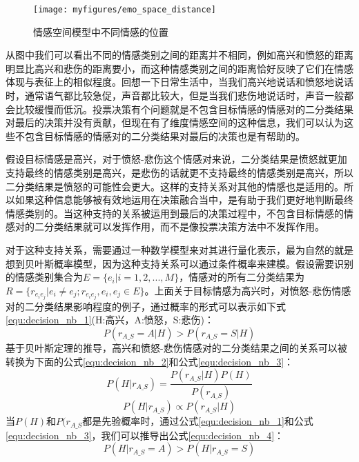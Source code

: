 \begin{figure}[htb] %
    \vspace{-0.8cm}  %
    \setlength{\belowcaptionskip}{0cm}   %
    \centering
    \texttt{[image: myfigures/emo\_space\_distance]}
    \caption{情感空间模型中不同情感的位置}
    \label{fig:emo_space_distance}
\end{figure}

从图中我们可以看出不同的情感类别之间的距离并不相同，例如高兴和愤怒的距离明显比高兴和悲伤的距离要小，而这种情感类别之间的距离恰好反映了它们在情感体现与表征上的相似程度。回想一下日常生活中，当我们高兴地说话和愤怒地说话时，通常语气都比较急促，声音都比较大，但是当我们悲伤地说话时，声音一般都会比较缓慢而低沉。投票决策有个问题就是不包含目标情感的情感对的二分类结果对最后的决策并没有贡献，但现在有了维度情感空间的这种信息，我们可以认为这些不包含目标情感的情感对的二分类结果对最后的决策也是有帮助的。

假设目标情感是高兴，对于愤怒-悲伤这个情感对来说，二分类结果是愤怒就更加支持最终的情感类别是高兴，是悲伤的话就更不支持最终的情感类别是高兴，所以二分类结果是愤怒的可能性会更大。这样的支持关系对其他的情感也是适用的。所以如果这种信息能够被有效地运用在决策融合当中，是有助于我们更好地判断最终情感类别的。当这种支持的关系被运用到最后的决策过程中，不包含目标情感的情感对的二分类结果就可以发挥作用，而不是像投票决策方法中不发挥作用。

对于这种支持关系，需要通过一种数学模型来对其进行量化表示，最为自然的就是想到贝叶斯概率模型，因为这种支持关系可以通过条件概率来建模。假设需要识别的情感类别集合为$E=\{e_i|i=1, 2,...,M\}$，情感对的所有二分类结果为$R = \{r_{e_ie_j}|e_i \neq e_j; r_{e_ie_j}, e_i, e_j \in E\}$。上面关于目标情感为高兴时，对愤怒-悲伤情感对的二分类结果影响程度的例子，通过概率的形式可以表示如下式\ref{equ:decision_nb_1}(H:高兴，A:愤怒，S:悲伤)：
\begin{equation}
\label{equ:decision_nb_1}
    P(r_{A\_S}=A|H) > P(r_{A\_S}=S|H)
\end{equation}
基于贝叶斯定理的推导，高兴和愤怒-悲伤情感对的二分类结果之间的关系可以被转换为下面的公式\ref{equ:decision_nb_2}和公式\ref{equ:decision_nb_3}：
\begin{equation}
\label{equ:decision_nb_2}
    P(H|r_{A\_S}) = \frac{P(r_{A\_S}|H)P(H)}{P(r_{A\_S})}
\end{equation}
\begin{equation}
\label{equ:decision_nb_3}
    P(H|r_{A\_S}) \propto P(r_{A\_S}|H)
\end{equation}
当$P(H)$和$P(r_{A\_S}$都是先验概率时，通过公式\ref{equ:decision_nb_1}和公式\ref{equ:decision_nb_3}，我们可以推导出公式\ref{equ:decision_nb_4}：
\begin{equation}
\label{equ:decision_nb_4}
    P(H|r_{A\_S}=A) > P(H|r_{A\_S}=S)
\end{equation}

